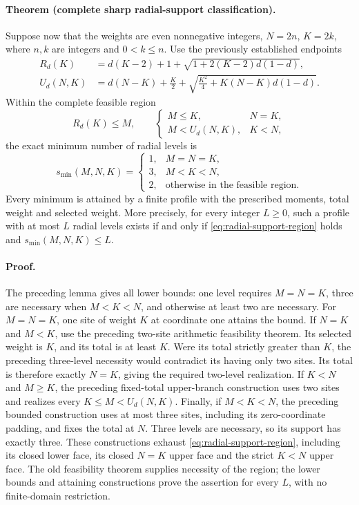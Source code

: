 \paragraph{Theorem (complete sharp radial-support classification).}
Suppose now that the weights are even nonnegative integers, \(N=2n\),
\(K=2k\), where \(n,k\) are integers and \(0<k\le n\).  Use the
previously established endpoints
\begin{align*}
 R_d(K)&=d(K-2)+1+\sqrt{1+2(K-2)d(1-d)},\\
 U_d(N,K)&=d(N-K)+\frac K2+
   \sqrt{\frac{K^2}{4}+K(N-K)d(1-d)}.
\end{align*}
Within the complete feasible region
\begin{equation}
 R_d(K)\le M,\qquad
 \begin{cases}M\le K,&N=K,\\M<U_d(N,K),&K<N,\end{cases}
 \label{eq:radial-support-region}
\end{equation}
the exact minimum number of radial levels is
\begin{equation}
 s_{\min}(M,N,K)=
 \begin{cases}
 1,&M=N=K,\\
 3,&M<K<N,\\
 2,&\text{otherwise in the feasible region}.
 \end{cases}
 \label{eq:radial-support-minimum}
\end{equation}
Every minimum is attained by a finite profile with the prescribed moments,
total weight and selected weight.  More precisely, for every integer
\(L\ge0\), such a profile with at most \(L\) radial levels exists if
and only if \eqref{eq:radial-support-region} holds and
\(s_{\min}(M,N,K)\le L\).

\paragraph{Proof.}
The preceding lemma gives all lower bounds: one level requires
\(M=N=K\), three are necessary when \(M<K<N\), and otherwise at
least two are necessary.  For \(M=N=K\), one site of weight \(K\)
at coordinate one attains the bound.  If \(N=K\) and \(M<K\), use
the preceding two-site arithmetic feasibility theorem.  Its selected
weight is \(K\), and its total is at least \(K\).  Were its total
strictly greater than \(K\), the preceding three-level necessity would
contradict its having only two sites.  Its total is therefore exactly
\(N=K\), giving the required two-level realization.  If \(K<N\)
and \(M\ge K\), the preceding fixed-total upper-branch construction
uses two sites and realizes every \(K\le M<U_d(N,K)\).  Finally, if
\(M<K<N\), the preceding bounded construction uses at most three
sites, including its zero-coordinate padding, and fixes the total at
\(N\).  Three levels are necessary, so its support has exactly three.
These constructions exhaust \eqref{eq:radial-support-region}, including
its closed lower face, its closed \(N=K\) upper face and the strict
\(K<N\) upper face.  The old feasibility theorem supplies necessity
of the region; the lower bounds and attaining constructions prove the
assertion for every \(L\), with no finite-domain restriction.

